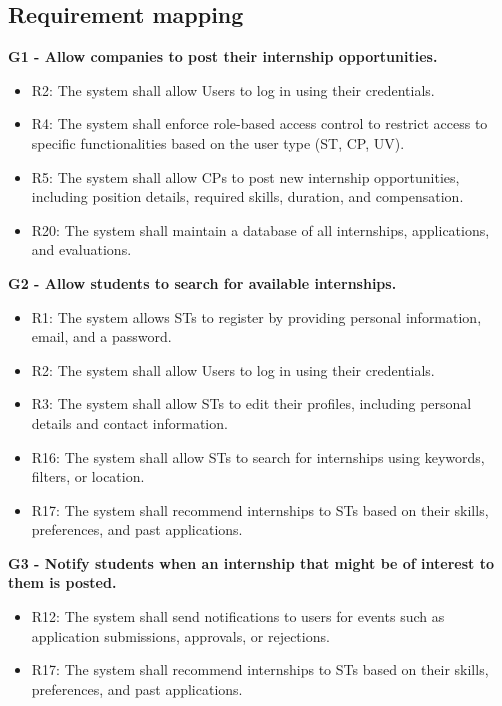 \subsection{Requirement mapping}
\label{subsec:requirement_mapping}%
\textbf{G1 - Allow companies to post their internship opportunities.}
\begin{itemize}
    \item R2: The system shall allow Users to log in using their credentials.
    \item R4: The system shall enforce role-based access control to restrict access to specific functionalities based on the user type (ST, CP, UV).
    \item R5: The system shall allow CPs to post new internship opportunities, including position details, required skills, duration, and compensation.
    \item R20: The system shall maintain a database of all internships, applications, and evaluations.
\end{itemize}

\vspace{1.5cm}
\textbf{G2 - Allow students to search for available internships.}
\begin{itemize}
    \item R1: The system allows STs to register by providing personal information, email, and a password.
    \item R2: The system shall allow Users to log in using their credentials.
    \item R3: The system shall allow STs to edit their profiles, including personal details and contact information.
    \item R16: The system shall allow STs to search for internships using keywords, filters, or location.
    \item R17: The system shall recommend internships to STs based on their skills, preferences, and past applications.
\end{itemize}

\vspace{1.5cm}
\textbf{G3 - Notify students when an internship that might be of interest to them is posted.}
\begin{itemize}
    \item R12: The system shall send notifications to users for events such as application submissions, approvals, or rejections.
    \item R17: The system shall recommend internships to STs based on their skills, preferences, and past applications.
\end{itemize}

